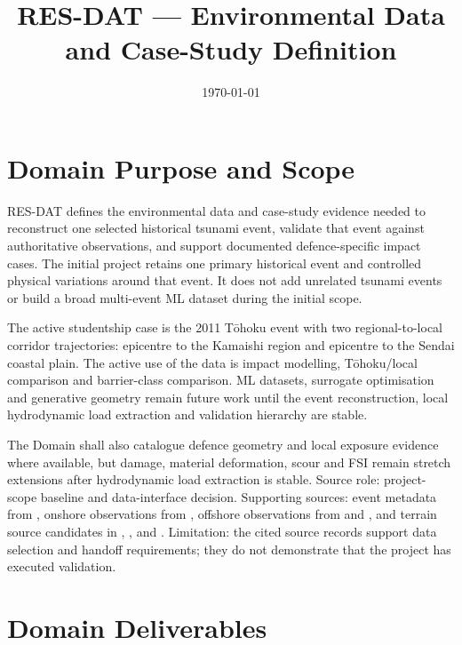 \documentclass[12pt,a4paper]{article}
\title{RES-DAT --- Environmental Data and Case-Study Definition}
\author{}
\date{\today}
\begin{document}
\maketitle

\tableofcontents
\clearpage

\section{Domain Purpose and Scope}
\label{sec:res-dat-domain-purpose}

RES-DAT defines the environmental data and case-study evidence needed to
reconstruct one selected historical tsunami event, validate that event against
authoritative observations, and support documented defence-specific impact
cases. The initial project retains one primary historical event and controlled
physical variations around that event. It does not add unrelated tsunami events
or build a broad multi-event ML dataset during the initial scope.

The active studentship case is the 2011 Tōhoku event with two
regional-to-local corridor trajectories: epicentre to the Kamaishi
region and epicentre to the Sendai coastal plain. The active use of the
data is impact modelling, Tōhoku/local comparison and barrier-class
comparison. ML datasets, surrogate optimisation and generative geometry
remain future work until the event reconstruction, local hydrodynamic
load extraction and validation hierarchy are stable.

The Domain shall also catalogue defence geometry and local exposure
evidence where available, but damage, material deformation, scour and
FSI remain stretch extensions after hydrodynamic load extraction is
stable. Source role: project-scope baseline and data-interface
decision. Supporting sources: event metadata from
\textcite{usgs2011tohokuEvent}, onshore observations from
\textcite{mori2012nationwide}, offshore observations from
\textcite{noaa2005dart} and \textcite{noaa2011japanDart}, and terrain
source candidates in \textcite{jodcJegg500}, \textcite{gebco2026grid},
\textcite{noaa2022etopo} and \textcite{gsiDemDownload}. Limitation:
the cited source records support data selection and handoff
requirements; they do not demonstrate that the project has executed
validation.

\section{Domain Deliverables}
\label{sec:res-dat-domain-deliverables}








\clearpage
\printbibliography[
  heading=bibintoc,
  title={References}
]
\end{document}
